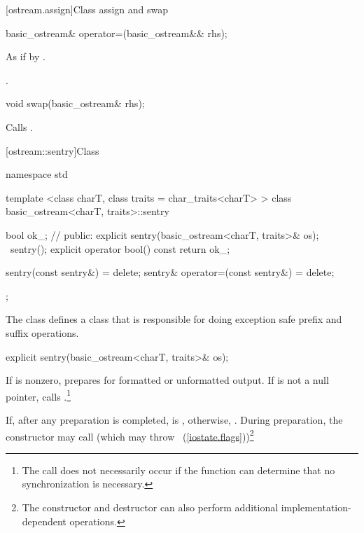 [ostream.assign]{Class  assign and swap}

%
\begin{itemdecl}
basic_ostream& operator=(basic_ostream&& rhs);
\end{itemdecl}

\begin{itemdescr}
\pnum
\effects As if by .

\pnum
\returns {}.
\end{itemdescr}

%
\begin{itemdecl}
void swap(basic_ostream& rhs);
\end{itemdecl}

\begin{itemdescr}
\pnum
\effects Calls .
\end{itemdescr}

[ostream::sentry]{Class }

%
%
\begin{codeblock}
namespace std {
  template <class charT, class traits = char_traits<charT> >
  class basic_ostream<charT, traits>::sentry {
    bool ok_; // \expos
  public:
    explicit sentry(basic_ostream<charT, traits>& os);
    ~sentry();
    explicit operator bool() const { return ok_; }

    sentry(const sentry&) = delete;
    sentry& operator=(const sentry&) = delete;
  };
}
\end{codeblock}

\pnum
The class
defines a class that is responsible for doing exception safe prefix and suffix
operations.

%
\begin{itemdecl}
explicit sentry(basic_ostream<charT, traits>& os);
\end{itemdecl}

\begin{itemdescr}
\pnum
If
is nonzero, prepares for formatted or unformatted output.
If
is not a null pointer, calls
%
.\footnote{The call
does not necessarily occur if the function can determine that no
synchronization is necessary.}

\pnum
If, after any preparation is completed,
is
,
otherwise,
.
During preparation, the constructor may call
(which may throw
~(\ref{iostate.flags}))\footnote{The
constructor and destructor
can also perform additional
implementation-dependent operations.}
\end{itemdescr}

